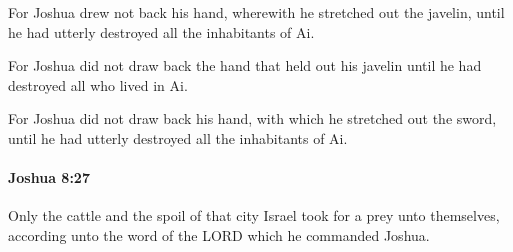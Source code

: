 			\begin{versebox}
					\item[BHS] 
					\item[ASV] For Joshua drew not back his hand, wherewith he stretched out the javelin, until he had utterly destroyed all the inhabitants of Ai.
					\item[NIV] For Joshua did not draw back the hand that held out his javelin until he had destroyed all who lived in Ai.
					\item[NRSV] For Joshua did not draw back his hand, with which he stretched out the sword, until he had utterly destroyed all the inhabitants of Ai.
			\end{versebox}

		\paragraph{Joshua 8:27} %
			\label{JOSHUA-8-27}

			Only the cattle and the spoil of that city Israel took for a prey unto themselves, according unto the word of the LORD which he commanded Joshua.

